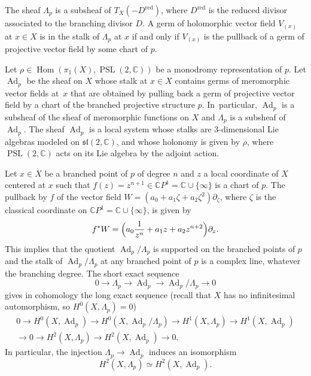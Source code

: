 \documentclass[JEP,XML,SOM,Unicode,NoEqCountersInSection,published]{cedram}
\newcommand{\C}{\mathbb C}
\newcommand{\CP}{\mathbb CP}
\newcommand{\red}{\mathrm{red}}
\DeclareMathOperator{\Ad}{Ad}
\DeclareMathOperator{\Hom}{Hom}
\DeclareMathOperator{\PSL}{PSL}
\theoremstyle{definition}
\theoremstyle{plain}
\begin{document}
The sheaf $\Lambda_p$ is a subsheaf of $T_X\left(-D^{\red}\right)$, where $D^{\red}$ is the reduced divisor associated to the branching divisor $D$.
A germ of holomorphic vector field $V_{(x)}$ at $x \in X$ is in the stalk of $\Lambda_p$ at $x$ if and only if $V_{(x)}$ is the pullback of a germ of projective vector field by some chart of $p$.

Let $\rho \in \Hom(\pi_1(X), \PSL(2, \C))$ be a monodromy representation of $p$.
Let $\Ad_p$ be the sheaf on $X$ whose stalk at $x \in X$ contains germs of meromorphic vector fields at~$x$ that are obtained by pulling back a germ of projective vector field by a chart of the branched projective structure $p$. In~particular, $\Ad_p$ is a subsheaf of the sheaf of meromorphic functions on $X$ and $\Lambda_p$ is a subsheaf of $\Ad_p$.
The sheaf $\Ad_p$ is a local system whose stalks are $3$-dimensional Lie algebras modeled on $\mathfrak{sl}(2, \C)$, and whose holonomy is given by $\rho$, where $\PSL(2, \C)$ acts on its Lie algebra by the adjoint action.

Let $x \in X$ be a branched point of $p$ of degree $n$ and $z$ a local coordinate of $X$ centered at $x$ such that $f(z) = z^{n+1} \in \CP^1 = \C \cup \{\infty\}$ is a chart of $p$.
The pullback by $f$ of the vector field $W = \left(a_0 + a_1 \zeta + a_2 \zeta^2\right) \partial_{\zeta}$, where $\zeta$ is the classical coordinate on $\CP^1 = \C \cup \{\infty\}$, is given by
\begin{equation*}
f^*W = \Bigl(a_0\frac 1 {z^n} + a_1 z + a_2 z^{n+2}\Bigr) \partial_z.
\end{equation*}
This implies that the quotient $\Ad_p / \Lambda_p$ is supported on the branched points of $p$ and the stalk of $\Ad_p / \Lambda_p$ at any branched point of $p$ is a complex line, whatever the branching degree.
The short exact sequence
\begin{equation*}
0 \to \Lambda_p \to \Ad_p \to \Ad_p / \Lambda_p \to 0
\end{equation*}
gives in cohomology the long exact sequence (recall that $X$ has no infinitesimal \hbox{automorphism}, so $H^0\left(X, \Lambda_p\right) = 0$)\vspace*{-3pt}
\begin{multline}\label{eq_exact_autom_local_syst}
0 \to H^0\left(X, \Ad_p\right) \to H^0\left(X, \Ad_p / \Lambda_p\right) \to H^1\left(X, \Lambda_p\right) \to H^1\left(X, \Ad_p\right)\\
\to 0 \to H^2\left(X, \Lambda_p\right) \to H^2\left(X, \Ad_p\right) \to 0.
\end{multline}
In particular, the injection $\Lambda_p \to \Ad_p$ induces an isomorphism
\[
H^2(X, \Lambda_p) \simeq H^2(X, \Ad_p).
\]
\end{document}
